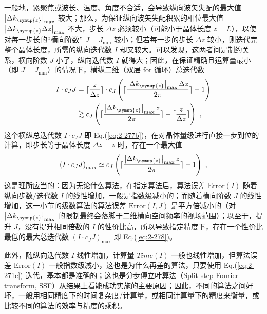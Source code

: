 一般地，紧聚焦或波长、温度、角度不合适，会导致纵向波矢失配的最大值 $\left|\Delta k_{\symup{z}}\right|_{\max}$ 较大；那么，为保证纵向波矢失配积累的相位最大值 $\left|\Delta k_{\symup{z}} \Delta z\right|_{\max}$ 不大，步长 $\Delta z$ 必须较小（可能小于晶体长度 $z = L$），以使对每一步长的“横向阶数” $J = J_{\min}$ 较小；但若每一步的步长 $\Delta z$ 较小，则迭代完整个晶体长度，所需的纵向迭代数 $I$ 却又较大。可以发现，这两者间是制约关系，横向阶数 $J$ 小了，纵向迭代数 $I$ 就得大；因此，在保证精确且运算量最小（即 $J = J_{\min}$）的情况下，横纵二维（双层 for 循环）总迭代数
\begin{subequations} \label{eq:2-277}
	\abovedisplayskip=13pt
	\belowdisplayskip=13pt
	\begin{align}
		I \cdot c_J J &= \lceil \frac{z}{\Delta z} \rceil \cdot c_J \left( \lceil \frac{ \left| \Delta k_{\symup{z}} \right|_{\max} \Delta z }{ 2 \pi } \rceil - 1 \right) \label{eq:2-277a} \\ &\gtrsim c_J \left( \lceil \frac{ \left| \Delta k_{\symup{z}} \right|_{\max} z }{ 2 \pi } \rceil - \lceil \frac{z}{\Delta z} \rceil \right) \label{eq:2-277b} ~,
	\end{align}
\end{subequations}
这个横纵总迭代数 $I \cdot c_J J$ 即 Eq.(\ref{eq:2-277b})，在对晶体量级进行直接一步到位的计算，即步长等于晶体长度 $\Delta z = z$ 时，存在一个最大值
\begin{equation} \label{eq:2-278}
	\left( I \cdot c_J J \right)_{\max} \simeq c_J \left( \lceil \frac{ \left| \Delta k_{\symup{z}} \right|_{\max} z }{ 2 \pi } \rceil - 1 \right) ~,
\end{equation}
这是理所应当的：因为无论什么算法，在指定算法后，算法误差 $\text{Error} \left( I \right)$ 随着纵向步数/迭代数 $I$ 的线性增加，一般是指数级减小的；而随着横向阶数 $J$ 的线性增加，这一小节的级数算法的算法误差 $\text{Error} \left( I, J \right)$ 是平方倍减小的（对 $\left|\Delta k_{\symup{z}}\right|_{\max}$ 的限制最终会落脚于二维横向空间频率的视场范围）；以至于，提升 $J$，没有提升相同倍数的 $I$ 的性价比高，所以导致指定精度下，存在一个性价比最低的最大总迭代数 $\left( I \cdot c_J J \right)_{\max}$ 即 Eq.(\ref{eq:2-278})。

此外，随纵向迭代数 $I$ 线性增加，计算量 $Time \left( I \right)$ 一般也线性增加，但算法误差 $\text{Error} \left( I \right)$ 一般指数级减小，这也是为什么再差的算法，只要使用 Eq.(\ref{eq:2-271c}) 迭代，基本都是准确的；这也是分步傅立叶算法（Split-step Fourier transform, SSF）从结果上看能成功实施的主要原因；因此，不同的算法之间好坏，一般用相同精度下的时间复杂度/计算量，或相同计算量下的精度来衡量，或比较不同的算法的效率与精度的乘积。


